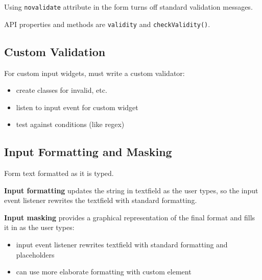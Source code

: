 \documentclass[11pt]{article}
\begin{document}
Using \texttt{novalidate} attribute in the form turns off standard validation messages.

API properties and methods are \texttt{validity} and \texttt{checkValidity()}.
\subsection{Custom Validation}
\label{sec:orgac0e37f}
For custom input widgets, must write a custom validator:
\begin{itemize}
\item create classes for invalid, etc.
\item listen to input event for custom widget
\item test against conditions (like regex)
\end{itemize}
\subsection{Input Formatting and Masking}
\label{sec:orgcb34ce6}
Form text formatted as it is typed.

\textbf{Input formatting} updates the string in textfield as the user types, so the input event listener
rewrites the textfield with standard formatting.

\textbf{Input masking} provides a graphical representation of the final format and fills it in as the
user types:
\begin{itemize}
\item input event listener rewrites textfield with standard formatting and placeholders
\item can use more elaborate formatting with custom element
\end{itemize}
\end{document}
